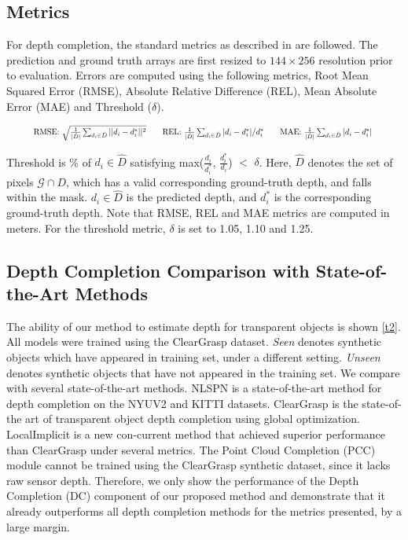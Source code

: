 \documentclass{article}
\begin{document}
\label{sec:result}
\subsection{Metrics}
\label{sec:metrics}
For depth completion, the standard metrics as described in \citep{ClearGrasp} are followed. The prediction and ground truth arrays are first resized to $144 \times 256$ resolution prior to evaluation. Errors are computed using the following metrics, Root Mean Squared Error (RMSE), Absolute Relative Difference (REL), Mean Absolute Error (MAE) and Threshold ($\delta$). 

\begin{equation}
\resizebox{0.9\textwidth}{!}{$
\textrm{RMSE: } \sqrt{\frac{1}{| \hat{D}|}\sum_{d_i \in \hat{D}} || d_i-d_i^*||^2}  \quad \quad \textrm{REL: } \frac{1}{| \hat{D}|}\sum_{d_i \in \hat{D}} | d_i-d_i^*|/d_i^* \quad \quad \textrm{MAE: } \frac{1}{| \hat{D}|}\sum_{d_i \in \hat{D}} | d_i-d_i^*|$
}
\end{equation}

Threshold is \% of $d_i \in \hat{D}$ satisfying max($\frac{d_i}{d_i^*}$, $\frac{d_i^*}{d_i}$) $<$ $\delta$. Here, $\hat{D}$ denotes the set of pixels $\mathcal{G} \cap D$, which has a valid corresponding ground-truth depth, and falls within the mask. $d_i \in \hat{D}$ is the predicted depth, and $d^*_i$ is the corresponding ground-truth depth. Note that RMSE, REL and MAE metrics are computed in meters. For the threshold metric, $\delta$ is set to 1.05, 1.10 and 1.25.

\subsection{Depth Completion Comparison with State-of-the-Art Methods}

The ability of our method to estimate depth for transparent objects is shown \autoref{t2}. All models were trained using the ClearGrasp \citep{ClearGrasp} dataset. \textit{Seen} denotes synthetic objects which have appeared in training set, under a different setting. \textit{Unseen} denotes synthetic objects that have not appeared in the training set. We compare with several state-of-the-art methods. NLSPN \citep{park2020nonlocal} is a state-of-the-art method for depth completion on the NYUV2 \citep{Silberman:ECCV12} and KITTI \citep{uhrig2017sparsity} datasets. ClearGrasp \citep{ClearGrasp} is the state-of-the art of transparent object depth completion using global optimization. LocalImplicit \citep{zhu2021rgbd} is a new con-current method that achieved superior performance than ClearGrasp under several metrics. The Point Cloud Completion (PCC) module cannot be trained using the ClearGrasp synthetic dataset, since it lacks raw sensor depth. Therefore, we only show the performance of the Depth Completion (DC) component of our proposed method and demonstrate that it already outperforms all depth completion methods for the metrics presented, by a large margin.
\end{document}
